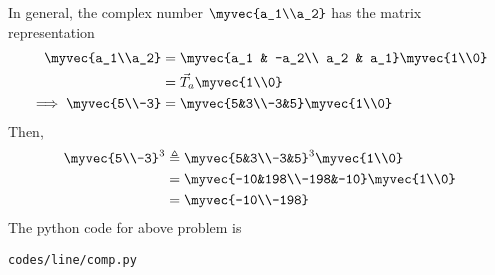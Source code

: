 In general, the complex number $\myvec{a_1\\a_2}$ has the matrix representation
\begin{align}
\label{eq:3.4.1_Complex}
\myvec{a_1\\a_2} &= \myvec{a_1 & -a_2\\ a_2 & a_1}\myvec{1\\0}
\\
&= \vec{T}_a\myvec{1\\0}
\\
\implies \myvec{5\\-3}&=\myvec{5&3\\-3&5}\myvec{1\\0}
\end{align}
Then,
\begin{align}
\myvec{5\\-3}^3 &\triangleq\myvec{5&3\\-3&5}^3\myvec{1\\0}
\\
 &= \myvec{-10&198\\-198&-10} \myvec{1\\0}
\\
&=\myvec{-10\\-198}
\end{align}
The python code for above problem is
\begin{lstlisting}
codes/line/comp.py
\end{lstlisting}
